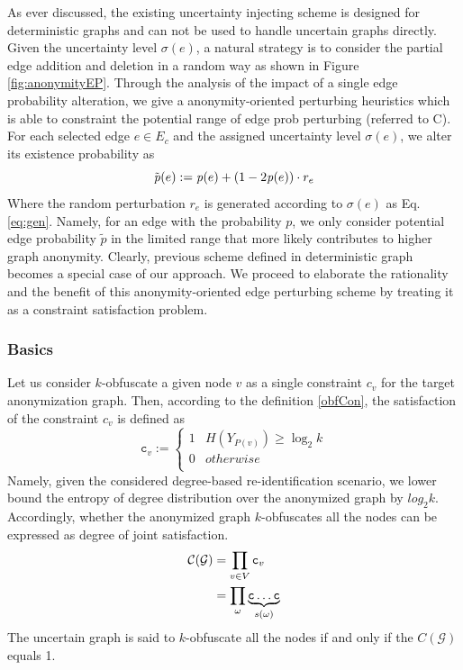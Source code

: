 As ever discussed, the existing uncertainty injecting scheme is designed for deterministic graphs and can not be used to handle uncertain graphs directly. Given the uncertainty level $\sigma(e)$, a natural strategy is to consider the partial edge addition and deletion in a random way as shown in Figure \ref{fig:anonymityEP}. Through the analysis of the impact of a single edge probability alteration, we give a anonymity-oriented perturbing heuristics which is able to constraint the potential range of edge prob perturbing (referred to C). For each selected edge $e \in E_{c}$ and the assigned uncertainty level $\sigma(e)$, we alter its existence probability as 
\vj
\begin{equation*}
    \tilde{\mathit{p}}(e):=\mathit{p}(e) + (1-2 \mathit{p}(e)) \cdot r_{e} 
    \svj
\end{equation*} 
Where the random perturbation $r_{e}$ is generated according to $\sigma(e)$ as Eq. \ref{eq:gen}. Namely, for an edge with the probability $p$, we only consider potential edge probability $\tilde{p}$ in the limited range that more likely contributes to higher graph anonymity. Clearly, previous scheme defined in deterministic graph becomes a special case of our approach. We proceed to elaborate the rationality and the benefit of this anonymity-oriented edge perturbing scheme by treating it as a constraint satisfaction problem. 
  
\subsubsection{Basics}
Let us consider $k$-obfuscate a given node $v$ as a single constraint $c_{v}$ for the target anonymization graph. Then, according to the definition \ref{obfCon}, the satisfaction of the constraint $c_{v}$ is defined as
\begin{equation*}
    \mathtt{c}_{v}:=
        \begin{cases}
                1  & H(Y_{P(v)}) \geq \log_{2}{k} \\
                0  & otherwise \\
         \end{cases}
\end{equation*}
Namely, given the considered degree-based re-identification scenario, we lower bound the entropy of degree distribution over the anonymized graph by $log_{2}{k}$. Accordingly, whether the anonymized graph $k$-obfuscates all the nodes can be expressed as degree of joint satisfaction.
\vj
\begin{align*}
    \mathcal{C(\mathcal{G})} &= \prod_{v \in V} \mathtt{c}_{v} \\
                &=\prod_{\omega} \underbrace{\mathtt{c} \ldots \mathtt{c}}_{s(\omega)}
    \svj
\end{align*}
The uncertain graph is said to $k$-obfuscate all the nodes if and only if the $C(\mathcal{G})$ equals 1.  
